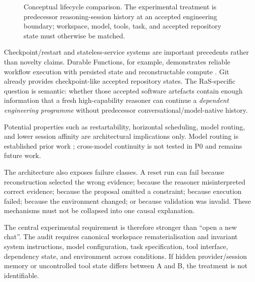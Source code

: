 \begin{figure}[htbp]
\centering

\caption{Conceptual lifecycle comparison. The experimental treatment is predecessor reasoning-session history at an accepted engineering boundary; workspace, model, tools, task, and accepted repository state must otherwise be matched.}
\label{fig:lifecycle}
\end{figure}

Checkpoint/restart and stateless-service systems are important precedents rather than novelty claims. Durable Functions, for example, demonstrates reliable workflow execution with persisted state and reconstructable compute \citep{burckhardt2021durable}. Git already provides checkpoint-like accepted repository states. The RaS-specific question is semantic: whether those accepted software artefacts contain enough information that a fresh high-capability reasoner can continue a \emph{dependent engineering programme} without predecessor conversational/model-native history.

Potential properties such as restartability, horizontal scheduling, model routing, and lower session affinity are architectural implications only. Model routing is established prior work \citep{ong2024routellm}; cross-model continuity is not tested in P0 and remains future work.

The architecture also exposes failure classes. A reset run can fail because reconstruction selected the wrong evidence; because the reasoner misinterpreted correct evidence; because the proposal omitted a constraint; because execution failed; because the environment changed; or because validation was invalid. These mechanisms must not be collapsed into one causal explanation.

The central experimental requirement is therefore stronger than “open a new chat”. The audit requires canonical workspace rematerialisation and invariant system instructions, model configuration, task specification, tool interface, dependency state, and environment across conditions. If hidden provider/session memory or uncontrolled tool state differs between A and B, the treatment is not identifiable.

